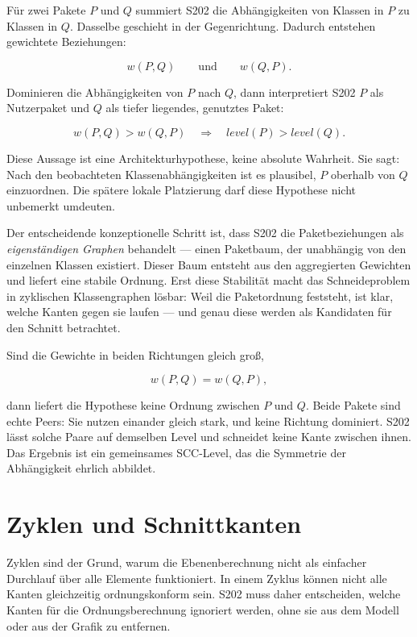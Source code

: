 \documentclass[a4paper,11pt]{article}
\begin{document}
F\"ur zwei Pakete $P$ und $Q$ summiert S202 die Abh\"angigkeiten von Klassen in
$P$ zu Klassen in $Q$. Dasselbe geschieht in der Gegenrichtung. Dadurch
entstehen gewichtete Beziehungen:

\[
  w(P,Q)
  \qquad\text{und}\qquad
  w(Q,P).
\]

Dominieren die Abh\"angigkeiten von $P$ nach $Q$, dann interpretiert S202
$P$ als Nutzerpaket und $Q$ als tiefer liegendes, genutztes Paket:

\[
  w(P,Q) > w(Q,P)
  \quad\Longrightarrow\quad
  level(P) > level(Q).
\]

Diese Aussage ist eine Architekturhypothese, keine absolute Wahrheit. Sie
sagt: Nach den beobachteten Klassenabh\"angigkeiten ist es plausibel, $P$
oberhalb von $Q$ einzuordnen. Die sp\"atere lokale Platzierung darf diese
Hypothese nicht unbemerkt umdeuten.

Der entscheidende konzeptionelle Schritt ist, dass S202 die Paketbeziehungen
als \emph{eigenst\"andigen Graphen} behandelt --- einen Paketbaum, der
unabh\"angig von den einzelnen Klassen existiert. Dieser Baum entsteht aus
den aggregierten Gewichten und liefert eine stabile Ordnung. Erst diese
Stabilit\"at macht das Schneideproblem in zyklischen Klassengraphen l\"osbar:
Weil die Paketordnung feststeht, ist klar, welche Kanten gegen sie laufen
--- und genau diese werden als Kandidaten f\"ur den Schnitt betrachtet.

Sind die Gewichte in beiden Richtungen gleich gro\ss{},

\[
  w(P,Q) = w(Q,P),
\]

dann liefert die Hypothese keine Ordnung zwischen $P$ und $Q$. Beide
Pakete sind echte Peers: Sie nutzen einander gleich stark, und keine
Richtung dominiert. S202 l\"asst solche Paare auf demselben Level und
schneidet keine Kante zwischen ihnen. Das Ergebnis ist ein gemeinsames
SCC-Level, das die Symmetrie der Abh\"angigkeit ehrlich abbildet.

\section{Zyklen und Schnittkanten}

Zyklen sind der Grund, warum die Ebenenberechnung nicht als einfacher
Durchlauf \"uber alle Elemente funktioniert. In einem Zyklus k\"onnen nicht
alle Kanten gleichzeitig ordnungskonform sein. S202 muss daher entscheiden,
welche Kanten f\"ur die Ordnungsberechnung ignoriert werden, ohne sie aus dem
Modell oder aus der Grafik zu entfernen.
\end{document}
